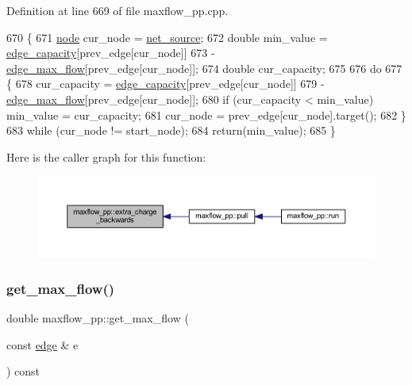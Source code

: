 Definition at line 669 of file maxflow\+\_\+pp.\+cpp.


\begin{DoxyCode}
670 \{
671     \mbox{\hyperlink{classnode}{node}} cur\_node = \mbox{\hyperlink{classmaxflow__pp_a20f2d05465acc2d7b777ea8025d12003}{net\_source}};
672     \textcolor{keywordtype}{double} min\_value = \mbox{\hyperlink{classmaxflow__pp_af3cdc4999a86322271a80b1855d58629}{edge\_capacity}}[prev\_edge[cur\_node]] 
673     - \mbox{\hyperlink{classmaxflow__pp_a25d5bb2ab6c775a634dacf408ff55a83}{edge\_max\_flow}}[prev\_edge[cur\_node]];
674     \textcolor{keywordtype}{double} cur\_capacity;
675 
676     \textcolor{keywordflow}{do}
677     \{
678     cur\_capacity = \mbox{\hyperlink{classmaxflow__pp_af3cdc4999a86322271a80b1855d58629}{edge\_capacity}}[prev\_edge[cur\_node]] 
679         - \mbox{\hyperlink{classmaxflow__pp_a25d5bb2ab6c775a634dacf408ff55a83}{edge\_max\_flow}}[prev\_edge[cur\_node]];
680     \textcolor{keywordflow}{if} (cur\_capacity < min\_value) min\_value = cur\_capacity;
681     cur\_node = prev\_edge[cur\_node].target();
682     \}
683     \textcolor{keywordflow}{while} (cur\_node != start\_node);
684     \textcolor{keywordflow}{return}(min\_value);
685 \}
\end{DoxyCode}
Here is the caller graph for this function\+:\nopagebreak
\begin{figure}[H]
\begin{center}
\leavevmode
\includegraphics[width=350pt]{classmaxflow__pp_a9d9651e53139201506b22eed1ecbdd51_icgraph}
\end{center}
\end{figure}
\mbox{\label{classmaxflow__pp_ac561a61619f363ef5d9b8fc5cfb10a5f}} 
\subsubsection{\texorpdfstring{get\+\_\+max\+\_\+flow()}{get\_max\_flow()}\hspace{0.1cm}{\footnotesize\ttfamily [1/2]}}
{\footnotesize\ttfamily double maxflow\+\_\+pp\+::get\+\_\+max\+\_\+flow (\begin{DoxyParamCaption}\item[{const \mbox{\hyperlink{classedge}{edge}} \&}]{e }\end{DoxyParamCaption}) const}

